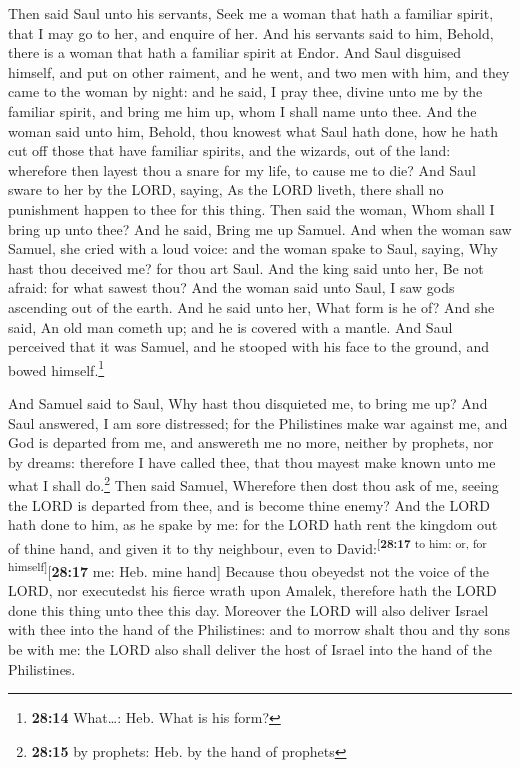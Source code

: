  Then said Saul unto his servants, Seek me a woman that
hath a familiar spirit, that I may go to her, and enquire of her. And
his servants said to him, Behold, there is a woman that hath a familiar
spirit at Endor.  And Saul disguised himself, and put on
other raiment, and he went, and two men with him, and they came to the
woman by night: and he said, I pray thee, divine unto me by the familiar
spirit, and bring me him up, whom I shall name unto thee. 
And the woman said unto him, Behold, thou knowest what Saul hath done,
how he hath cut off those that have familiar spirits, and the wizards,
out of the land: wherefore then layest thou a snare for my life, to
cause me to die?  And Saul sware to her by the LORD,
saying, As the LORD liveth, there shall no punishment happen to thee for
this thing.  Then said the woman, Whom shall I bring up
unto thee? And he said, Bring me up Samuel.  And when the
woman saw Samuel, she cried with a loud voice: and the woman spake to
Saul, saying, Why hast thou deceived me? for thou art Saul.
 And the king said unto her, Be not afraid: for what
sawest thou? And the woman said unto Saul, I saw gods ascending out of
the earth.  And he said unto her, What form is he of? And
she said, An old man cometh up; and he is covered with a mantle. And
Saul perceived that it was Samuel, and he stooped with his face to the
ground, and bowed himself.\footnote{\textbf{28:14} What\ldots: Heb. What
  is his form?}

 And Samuel said to Saul, Why hast thou disquieted me, to
bring me up? And Saul answered, I am sore distressed; for the
Philistines make war against me, and God is departed from me, and
answereth me no more, neither by prophets, nor by dreams: therefore I
have called thee, that thou mayest make known unto me what I shall
do.\footnote{\textbf{28:15} by prophets: Heb. by the hand of prophets}
 Then said Samuel, Wherefore then dost thou ask of me,
seeing the LORD is departed from thee, and is become thine enemy?
 And the LORD hath done to him, as he spake by me: for
the LORD hath rent the kingdom out of thine hand, and given it to thy
neighbour, even to David:\textsuperscript{{[}\textbf{28:17} to him: or,
for himself{]}}{[}\textbf{28:17} me: Heb. mine hand{]} 
Because thou obeyedst not the voice of the LORD, nor executedst his
fierce wrath upon Amalek, therefore hath the LORD done this thing unto
thee this day.  Moreover the LORD will also deliver
Israel with thee into the hand of the Philistines: and to morrow shalt
thou and thy sons be with me: the LORD also shall deliver the host of
Israel into the hand of the Philistines.

